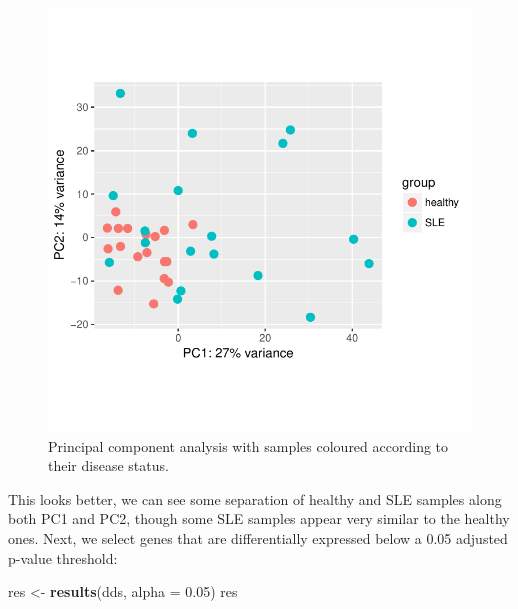 \documentclass[9pt,a4paper,]{extarticle}
\newenvironment{Shaded}{\begin{snugshade}}{\end{snugshade}}
\newcommand{\KeywordTok}[1]{\textcolor[rgb]{0.13,0.29,0.53}{\textbf{#1}}}
\newcommand{\DataTypeTok}[1]{\textcolor[rgb]{0.13,0.29,0.53}{#1}}
\newcommand{\FloatTok}[1]{\textcolor[rgb]{0.00,0.00,0.81}{#1}}
\newcommand{\StringTok}[1]{\textcolor[rgb]{0.31,0.60,0.02}{#1}}
\newcommand{\NormalTok}[1]{#1}
\begin{document}
\begin{figure}

{\centering \includegraphics{biocondutor-regulatory-genomics-workflow_files/figure-latex/pca-1} 

}

\caption{Principal component analysis with samples coloured according to their disease status.}\label{fig:pca}
\end{figure}

This looks better, we can see some separation of healthy and SLE samples along both PC1 and PC2, though some SLE samples appear very similar to the healthy ones.
Next, we select genes that are differentially expressed below a 0.05 adjusted p-value threshold:

\begin{Shaded}
\begin{Highlighting}[]
\NormalTok{res <-}\StringTok{ }\KeywordTok{results}\NormalTok{(dds, }\DataTypeTok{alpha =} \FloatTok{0.05}\NormalTok{)}
\NormalTok{res}
\end{Highlighting}
\end{Shaded}
\end{document}
